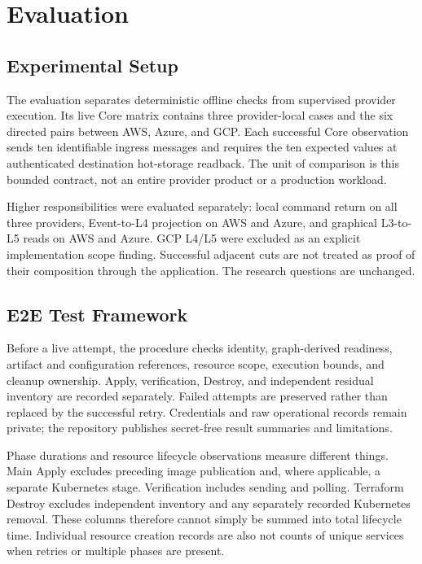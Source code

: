 \chapter{\label{chap:evaluation}Evaluation}


\section{Experimental Setup}
\label{sec:eval-setup}
The evaluation separates deterministic offline checks from supervised provider
execution. Its live Core matrix contains three provider-local cases and the six
directed pairs between AWS, Azure, and GCP. Each successful Core observation
sends ten identifiable ingress messages and requires the ten expected values
at authenticated destination hot-storage readback. The unit of comparison is
this bounded contract, not an entire provider product or a production workload.

Higher responsibilities were evaluated separately: local command return on all
three providers, Event-to-L4 projection on AWS and Azure, and graphical L3-to-L5
reads on AWS and Azure. GCP L4/L5 were excluded as an explicit implementation
scope finding. Successful adjacent cuts are not treated as proof of their
composition through the application. The research questions are unchanged.

\section{E2E Test Framework}
\label{sec:eval-framework}
Before a live attempt, the procedure checks identity, graph-derived readiness,
artifact and configuration references, resource scope, execution bounds, and
cleanup ownership. Apply, verification, Destroy, and independent residual
inventory are recorded separately. Failed attempts are preserved rather than
replaced by the successful retry. Credentials and raw operational records remain
private; the repository publishes secret-free result summaries and limitations.

Phase durations and resource lifecycle observations measure different things.
Main Apply excludes preceding image publication and, where applicable, a
separate Kubernetes stage. Verification includes sending and polling. Terraform
Destroy excludes independent inventory and any separately recorded Kubernetes
removal. These columns therefore cannot simply be summed into total lifecycle
time. Individual resource creation records are also not counts of unique
services when retries or multiple phases are present.

